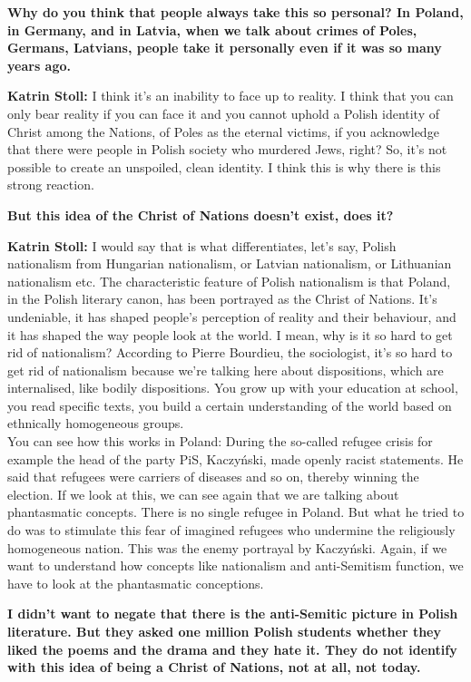 \textbf{Why do you think that people always take this so personal? In Poland, in Germany, and in Latvia, when we talk about crimes of Poles, Germans, Latvians, people take it personally even if it was so many years ago.}

\textbf{Katrin Stoll:} I think it’s an inability to face up to reality. I think that you can only bear reality if you can face it and you cannot uphold a Polish identity of Christ among the Nations, of Poles as the eternal victims, if you acknowledge that there were people in Polish society who murdered Jews, right? So, it’s not possible to create an unspoiled, clean identity. I think this is why there is this strong reaction.  

\textbf{But this idea of the Christ of Nations doesn’t exist, does it?} 

\textbf{Katrin Stoll:} I would say that is what differentiates, let’s say, Polish nationalism from Hungarian nationalism, or Latvian nationalism, or Lithuanian nationalism etc. The characteristic feature of Polish nationalism is that Poland, in the Polish literary canon, has been portrayed as the Christ of Nations. It’s undeniable, it has shaped people’s perception of reality and their behaviour, and it has shaped the way people look at the world. I mean, why is it so hard to get rid of nationalism? According to Pierre Bourdieu, the sociologist, it’s so hard to get rid of nationalism because we're talking here about dispositions, which are internalised, like bodily dispositions. You grow up with your education at school, you read specific texts, you build a certain understanding of the world based on ethnically homogeneous groups.\\ 
You can see how this works in Poland: During the so-called refugee crisis for example the head of the party PiS, Kaczyński, made openly racist statements. He said that refugees were carriers of diseases and so on, thereby winning the election. If we look at this, we can see again that we are talking about phantasmatic concepts. There is no single refugee in Poland. But what he tried to do was to stimulate this fear of imagined refugees who undermine the religiously homogeneous nation. This was the enemy portrayal by Kaczyński. Again, if we want to understand how concepts like nationalism and anti-Semitism function, we have to look at the phantasmatic conceptions. 

\textbf{I didn’t want to negate that there is the anti-Semitic picture in Polish literature. But they asked one million Polish students whether they liked the poems and the drama and they hate it. They do not identify with this idea of being a Christ of Nations, not at all, not today.} 

